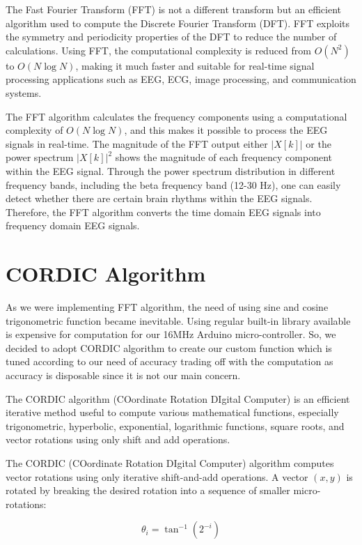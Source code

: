 The Fast Fourier Transform (FFT) is not a different transform but an efficient algorithm used to compute the Discrete Fourier Transform (DFT). FFT exploits the symmetry and periodicity properties of the DFT to reduce the number of calculations. Using FFT, the computational complexity is reduced from $O(N^2)$ to $O(N \log N)$, making it much faster and suitable for real-time signal processing applications such as EEG, ECG, image processing, and communication systems.

The FFT algorithm calculates the frequency components using a computational complexity of $O(N\log N)$, and this makes it possible to process the EEG signals in real-time. The magnitude of the FFT output either $|X[k]|$ or the power spectrum $|X[k]|^2$ shows the magnitude of each frequency component within the EEG signal. Through the power spectrum distribution in different frequency bands, including the beta frequency band (12-30 Hz), one can easily detect whether there are certain brain rhythms within the EEG signals. Therefore, the FFT algorithm converts the time domain EEG signals into frequency domain EEG signals.

\section{CORDIC Algorithm}
As we were implementing FFT algorithm, the need of using sine and cosine trigonometric function became inevitable. Using regular built-in library available is expensive for computation for our 16MHz Arduino micro-controller. So, we decided to adopt CORDIC algorithm to create our custom function which is tuned according to our need of accuracy trading off with the computation as accuracy is disposable since it is not our main concern.

The CORDIC algorithm (COordinate Rotation DIgital Computer) is an efficient iterative method useful to compute various mathematical functions, especially trigonometric, hyperbolic, exponential, logarithmic functions, square roots, and vector rotations using only shift and add operations.


The CORDIC (COordinate Rotation DIgital Computer) algorithm computes vector rotations using only iterative shift-and-add operations. 
A vector $(x, y)$ is rotated by breaking the desired rotation into a sequence of smaller micro-rotations:

\begin{equation}
	\theta_i = \tan^{-1}(2^{-i})
\end{equation}

